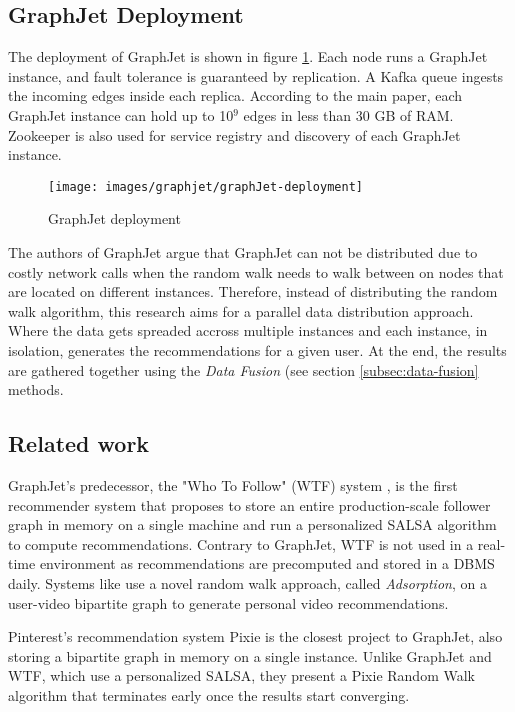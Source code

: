 \subsection{GraphJet Deployment}
\label{subsec:GraphJet-Deployment}
The deployment of GraphJet is shown in figure \ref{fig:graphJet-deployment}. Each node runs a GraphJet instance, and fault tolerance is guaranteed by replication. A Kafka queue ingests the incoming edges inside each replica. According to the main paper, each GraphJet instance can hold up to 10$^9$ edges in less than 30 GB of RAM. Zookeeper is also used for service registry and discovery of each GraphJet instance.
\begin{figure}[!htb]
    \centering
    \texttt{[image: images/graphjet/graphJet-deployment]}
    \caption{GraphJet deployment \cite{sharmaGraphJetRealtimeContent2016}}
    \label{fig:graphJet-deployment}
\end{figure}

The authors of GraphJet argue that GraphJet can not be distributed due to costly network calls when the random walk needs to walk between on nodes that are located on different instances. Therefore, instead of distributing the random walk algorithm, this research aims for a parallel data distribution approach. Where the data gets spreaded accross multiple instances and each instance, in isolation, generates the recommendations for a given user. At the end, the results are gathered together using the \emph{Data Fusion} (see section \ref{subsec:data-fusion} methods.

\subsection{Related work}
\label{subsec:graphjet-related-work}
GraphJet's predecessor, the "Who To Follow" (WTF) system \cite{guptaWTFWhoFollow2013}, is the first recommender system that proposes to store an entire production-scale follower graph in memory on a single machine and run a personalized SALSA algorithm to compute recommendations. Contrary to GraphJet, WTF is not used in a real-time environment as recommendations are precomputed and stored in a DBMS daily. Systems like \cite{balujaVideoSuggestionDiscovery2008} use a novel random walk approach, called \emph{Adsorption}, on a user-video bipartite graph to generate personal video recommendations.


Pinterest's recommendation system Pixie \cite{eksombatchaiPixieSystemRecommending2018} is the closest project to GraphJet, also storing a bipartite graph in memory on a single instance. Unlike GraphJet and WTF, which use a personalized SALSA, they present a Pixie Random Walk algorithm that terminates early once the results start converging.
